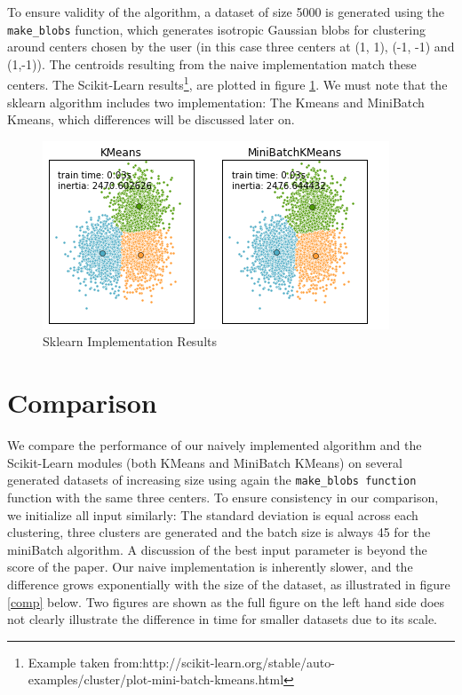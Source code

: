 \documentclass[11pt]{article}
\begin{document}
\noindent To ensure validity of the algorithm, a dataset of size 5000 is generated using the \verb|make_blobs| function, which generates isotropic Gaussian blobs for clustering around centers chosen by the user (in this case three centers at (1, 1), (-1, -1) and (1,-1)). The centroids resulting from the naive implementation match these centers.
The Scikit-Learn results\footnote{Example taken from:http://scikit-learn.org/stable/auto-examples/cluster/plot-mini-batch-kmeans.html}, are plotted in figure \ref{results}. We must note that the sklearn algorithm includes two implementation: The Kmeans and MiniBatch Kmeans, which differences will be discussed later on.

	\begin{figure}[ht!] 
		\centering
		\includegraphics[scale=0.8]{Figures/kmeans.png}
		\caption{Sklearn Implementation Results}
		\label{results}
	\end{figure}

\section*{Comparison}

We compare the performance of our naively implemented algorithm and the Scikit-Learn modules (both KMeans and MiniBatch KMeans) on several generated datasets of increasing size using again the \verb|make_blobs function| function with the same three centers. To ensure consistency in our comparison, we initialize all input similarly: The standard deviation is equal across each clustering, three clusters are generated and the batch size is always 45 for the miniBatch algorithm. A discussion of the best input parameter is  beyond the score of the paper.  Our naive implementation is inherently slower, and the difference grows exponentially with the size of the dataset,  as illustrated in figure \ref{comp} below. Two figures are shown as the full figure on the left hand side does not clearly illustrate the difference in time for smaller datasets due to its scale.
\end{document}
